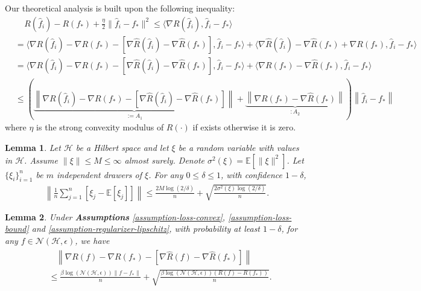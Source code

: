 \documentclass{article}
\newtheorem{lemma}{Lemma}
\begin{document}
Our theoretical analysis is built upon the following inequality:
\begin{align}
 \nonumber &~~~~~R(\hat{f}_i)-R(f_\ast)+\frac{\eta}{2}\|\hat{f}_i-f_\ast\|^2
  \leq \langle \nabla R(\hat{f}_i),\hat{f}_i-f_\ast\rangle
  \\ \nonumber&=\langle \nabla R(\hat{f}_i)-\nabla R(f_\ast)-[\nabla \hat{R}(\hat{f}_i)-\nabla \hat{R}(f_\ast)],
   \hat{f}_i-f_\ast\rangle+\langle
   \nabla \hat{R}(\hat{f}_i)-\nabla \hat{R}(f_\ast)+\nabla R(f_\ast), \hat{f}_i-f_\ast\rangle\\
   &\nonumber=\langle \nabla R(\hat{f}_i)-\nabla R(f_\ast)-[\nabla \hat{R}(\hat{f}_i)-\nabla \hat{R}(f_\ast)],
   \hat{f}_i-f_\ast\rangle+\langle \nabla R(f_\ast)-\nabla \hat{R}(f_\ast), \hat{f}_i-f_\ast\rangle\\
   \label{equation-important-middle}
   &\leq \left(\underbrace{\left\|\nabla R(\hat{f}_i)-\nabla R(f_\ast)-[\nabla \hat{R}(\hat{f}_i)-\nabla \hat{R}(f_\ast)]\right\|}_{:=A_1}+
   \underbrace{\left\|\nabla R(f_\ast)-\nabla \hat{R}(f_\ast)\right\|}_{:A_2}\right)\left\|\hat{f}_i-f_\ast \right\|
\end{align}
where $\eta$ is the strong convexity modulus of $R(\cdot)$ if exists otherwise it is zero.
\begin{lemma}
  \label{lem-nonequation}
    Let $\mathcal{H}$ be a Hilbert space and let $\xi$ be a random variable with values in $\mathcal{H}$.
    Assume $\|\xi\|\leq M\leq \infty$ almost surely.
    Denote $\sigma^2(\xi)=\mathbb{E}[\|\xi\|^2]$.
    Let $\{\xi_i\}_{i=1}^n$ be $m$ independent drawers of $\xi$.
    For any $0\leq \delta\leq 1$, with confidence $1-\delta$,
    \begin{align*}
      \left\|\frac{1}{n}\sum_{j=1}^n[\xi_j-\mathbb{E}[\xi_j]]\right\|\leq \frac{2M\log(2/\delta)}{n}+\sqrt{\frac{2\sigma^2(\xi)\log(2/\delta)}{n}}.
    \end{align*}
  \end{lemma}
\begin{lemma}
\label{lemma-nablaR-nablahat}
  Under \textbf{Assumptions} \ref{assumption-loss-convex}, \ref{assumption-loss-bound} and \ref{assumption-regularizer-lipschitz}, with probability at least $1-\delta$,
  for any $f\in\mathcal{N}(\mathcal{H},\epsilon)$,
  we have
  \begin{align}
  \label{equation-nabalRR-empRR}
  \begin{aligned}
    &~~~~\left\|\nabla R(f)-\nabla R(f_\ast)-[\nabla \hat{R}(f)-\nabla \hat{R}(f_\ast)]\right\| \\
   &\leq \frac{\beta \log\left(\mathcal{N}(\mathcal{H},\epsilon)\right)\|f-f_\ast\|}{n}+\sqrt{\frac{\beta \log\left(\mathcal{N}(\mathcal{H},\epsilon)\right)(R(f)-R(f_\ast))}{n}}.
  \end{aligned}
  \end{align}
\end{lemma}
\end{document}
